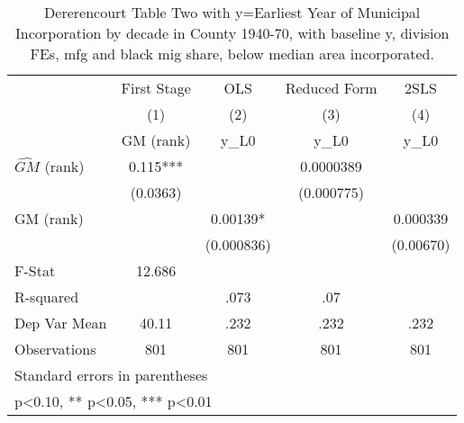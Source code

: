 \begin{table}[htbp]\centering
\def\sym#1{\ifmmode^{#1}\else\(^{#1}\)\fi}
\caption{Dererencourt Table Two with y=Earliest Year of Municipal Incorporation by decade in County 1940-70, with baseline y, division FEs, mfg and black mig share, below median area incorporated.}
\begin{tabular}{l*{4}{c}}
\toprule
                    & First Stage   &         OLS   &Reduced Form   &        2SLS   \\
                    &\multicolumn{1}{c}{(1)}&\multicolumn{1}{c}{(2)}&\multicolumn{1}{c}{(3)}&\multicolumn{1}{c}{(4)}\\
                    &\multicolumn{1}{c}{GM  (rank)}&\multicolumn{1}{c}{y\_L0}&\multicolumn{1}{c}{y\_L0}&\multicolumn{1}{c}{y\_L0}\\
\midrule
$\hat{GM}$ (rank)   &       0.115***&               &   0.0000389   &               \\
                    &    (0.0363)   &               &  (0.000775)   &               \\
\addlinespace
GM  (rank)          &               &     0.00139*  &               &    0.000339   \\
                    &               &  (0.000836)   &               &   (0.00670)   \\
\midrule
F-Stat              &      12.686   &               &               &               \\
R-squared           &               &        .073   &         .07   &               \\
Dep Var Mean        &       40.11   &        .232   &        .232   &        .232   \\
Observations        &         801   &         801   &         801   &         801   \\
\bottomrule
\multicolumn{5}{l}{\footnotesize Standard errors in parentheses}\\
\multicolumn{5}{l}{\footnotesize * p<0.10, ** p<0.05, *** p<0.01}\\
\end{tabular}
\end{table}

